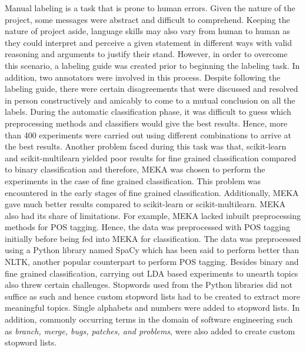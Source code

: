 \documentclass[a4paper,12pt,twoside]{report}
\begin{document}
\newline \newline
Manual labeling is a task that is prone to human errors. Given the nature of the project, some messages were abstract and difficult to comprehend. Keeping the nature of project aside, language skills may also vary from human to human as they could interpret and perceive a given statement in different ways with valid reasoning and arguments to justify their stand. However, in order to overcome this scenario, a labeling guide was created prior to beginning the labeling task. In addition, two annotators were involved in this process. Despite following the labeling guide, there were certain disagreements that were discussed and resolved in person constructively and amicably to come to a mutual conclusion on all the labels. 
\newline \newline
During the automatic classification phase, it was difficult to guess which preprocessing methods and classifiers would give the best results. Hence, more than 400 experiments were carried out using different combinations to arrive at the best results. Another problem faced during this task was that, scikit-learn and scikit-multilearn yielded poor results for fine grained classification compared to binary classification and therefore, MEKA was chosen to perform the experiments in the case of fine grained classification. This problem was encountered in the early stages of fine grained classification. Additionally, MEKA gave much better results compared to scikit-learn or scikit-multilearn. 
\newline \newline
MEKA also had its share of limitations. For example, MEKA lacked inbuilt preprocessing methods for POS tagging. Hence, the data was preprocessed with POS tagging initially before being fed into MEKA for classification. The data was preprocessed using a Python library named SpaCy which has been said to perform better than NLTK, another popular counterpart to perform POS tagging. 
\newline \newline
Besides binary and fine grained classification, carrying out LDA based experiments to unearth topics also threw certain challenges. Stopwords used from the Python libraries did not suffice as such and hence custom stopword lists had to be created to extract more meaningful topics. Single alphabets and numbers were added to stopword lists. In addition, commonly occurring terms in the domain of software engineering such as \textit{branch, merge, bugs, patches, and problems}, were also added to create custom stopword lists. 
\end{document}

